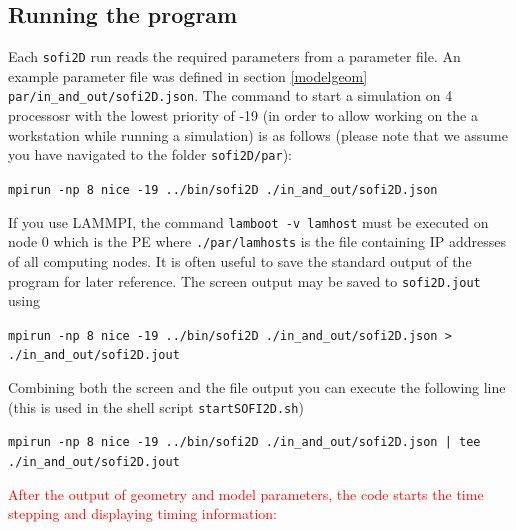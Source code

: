 \subsection{Running the program}
\label{compexec1} 
Each \texttt{sofi2D} run reads the required parameters from a parameter file. An example parameter file was defined in section \ref{modelgeom} \texttt{par/in\_and\_out/sofi2D.json}. The command to start a simulation on 4 processosr with the lowest priority of -19 (in order to allow working on the a workstation while running a simulation) is as follows (please note that we assume you have navigated to the folder \texttt{sofi2D/par}):

\texttt{mpirun -np 8 nice -19 ../bin/sofi2D ./in\_and\_out/sofi2D.json }

If you use LAMMPI, the command \texttt{lamboot -v lamhost} must be executed on node 0 which is the PE where \texttt{./par/lamhosts} is the file containing IP addresses of all computing nodes. It is often useful to save the standard output of the program for later reference. The screen output may be saved to \texttt{sofi2D.jout} using 

\texttt{mpirun -np 8 nice -19 ../bin/sofi2D ./in\_and\_out/sofi2D.json > ./in\_and\_out/sofi2D.jout}

Combining both the screen and the file output you can execute the following line (this is used in the shell script \texttt{startSOFI2D.sh})

\texttt{mpirun -np 8 nice -19 ../bin/sofi2D ./in\_and\_out/sofi2D.json | tee \\
./in\_and\_out/sofi2D.jout}

\textcolor{red}{After the output of geometry and model parameters, the code starts the time stepping and displaying timing information:}

